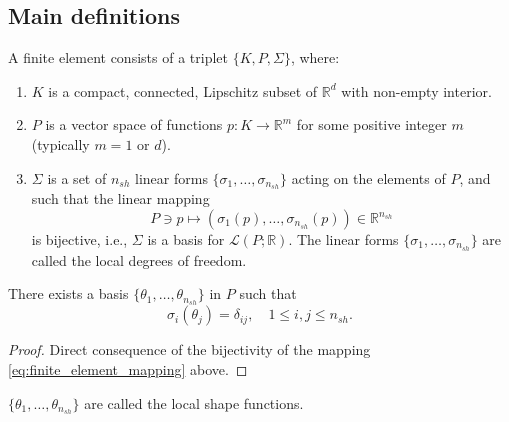 \subsection{Main definitions}
\begin{definition}\label{def:finiteelements}
    A finite element consists of a triplet $\{K, P, \Sigma\}$, where:
    \begin{enumerate}
        \item $K$ is a compact, connected, Lipschitz subset of $\mathbb{R}^d$ with non-empty interior.
        \item $P$ is a vector space of functions $p: K \rightarrow \mathbb{R}^m$ for some positive integer $m$ (typically $m = 1$ or $d$).
        \item $\Sigma$ is a set of $n_{sh}$ linear forms $\{\sigma_1, \dots, \sigma_{n_{sh}}\}$ acting on the elements of $P$, and such that the linear mapping
        \begin{equation*}
            \label{eq:finite_element_mapping}
            P \ni p \mapsto (\sigma_1(p), \dots, \sigma_{n_{sh}}(p)) \in \mathbb{R}^{n_{sh}}
        \end{equation*}
        is bijective, i.e., $\Sigma$ is a basis for $\mathcal{L}(P; \mathbb{R})$. The linear forms $\{\sigma_1, \dots, \sigma_{n_{sh}}\}$ are called the local degrees of freedom.
    \end{enumerate}
\end{definition}

\begin{lemma}\label{lemma:basis_from_bijectivity}
    There exists a basis $\{\theta_1, \dots, \theta_{n_{sh}}\}$ in $P$ such that
    \begin{equation*}
\sigma_i(\theta_j) = \delta_{ij}, \quad 1 \le i,j \le n_{sh}.
\end{equation*}
    \begin{proof}
        Direct consequence of the bijectivity of the mapping \eqref{eq:finite_element_mapping} above.
    \end{proof}
\end{lemma}


\begin{definition}
    $\{\theta_1, \dots, \theta_{n_{sh}}\}$ are called the local shape functions.
\end{definition}

